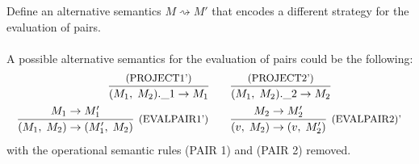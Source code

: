 \subsection{}

Define an alternative semantics $M \rightsquigarrow M'$ that encodes a different strategy for the
evaluation of pairs.\\~\\
A possible alternative semantics for the evaluation of pairs could be the following:
\begin{align*}
	\infer{\FST{\PAIR{M_1}{M_2}} \to M_1}{\text{\small{(PROJECT1')}}}                       &
	\qquad \infer{\SND{\PAIR{M_1}{M_2}} \to M_2}{\text{\small{(PROJECT2')}}}                  \\
	\infer[\text{\small{(EVALPAIR1')}}]{\PAIR{M_1}{M_2} \to \PAIR{M_1'}{M_2}}{M_1 \to M_1'} &
	\qquad
	\infer[\text{\small{(EVALPAIR2)}'}]{\PAIR{v}{M_2} \to \PAIR{v}{M_2'}}{M_2 \to M_2'}
\end{align*}
with the operational semantic rules (PAIR 1) and (PAIR 2) removed.
